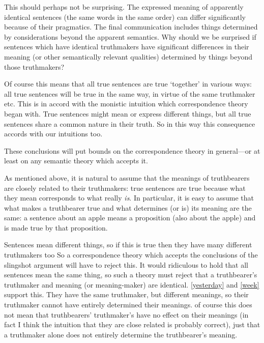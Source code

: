 This should perhaps not be surprising.
The expressed meaning of apparently identical sentences (the same words in the same order) can differ significantly because of their pragmatics.
The final communication includes things determined by considerations beyond the apparent semantics. %
Why should we be surprised if sentences which have identical truthmakers have significant differences in their meaning (or other semantically relevant qualities) determined by things beyond those truthmakers?

Of course this means that all true sentences are true `together' in various ways: all true sentences will be true in the same way, in virtue of the same truthmaker etc.
This is in accord with the monistic intuition which correspondence theory began with.
True sentences might mean or express different things, but all true sentences share a common nature in their truth.
So in this way this consequence accords with our intuitions too.

These conclusions will put bounds on the correspondence theory in general---or at least on any semantic theory which accepts it.

As mentioned above, it is natural to assume that the meanings of truthbearers are closely related to their truthmakers: true sentences are true because what they mean corresponds to what really \emph{is}.
In particular, it is easy to assume that what makes a truthbearer true and what determines (or is) its meaning are the same: a sentence about an apple means a proposition (also about the apple) and is made true by that proposition.

Sentences mean different things, so if this is true then they have many different truthmakers too
So a correspondence theory which accepts the conclusions of the slingshot argument will have to reject this.
It would ridiculous to hold that all sentences mean the same thing, so such a theory must reject that a truthbearer's truthmaker and meaning (or meaning-maker) are identical.
\ref{yesterday} and \ref{week} support this.
They have the same truthmaker, but different meanings, so their truthmaker cannot have entirely determined their meanings.
of course this does not mean that truthbearers' truthmaker's have no effect on their meanings (in fact I think the intuition that they are close related is probably correct), just that a truthmaker alone does not entirely determine the truthbearer's meaning.

